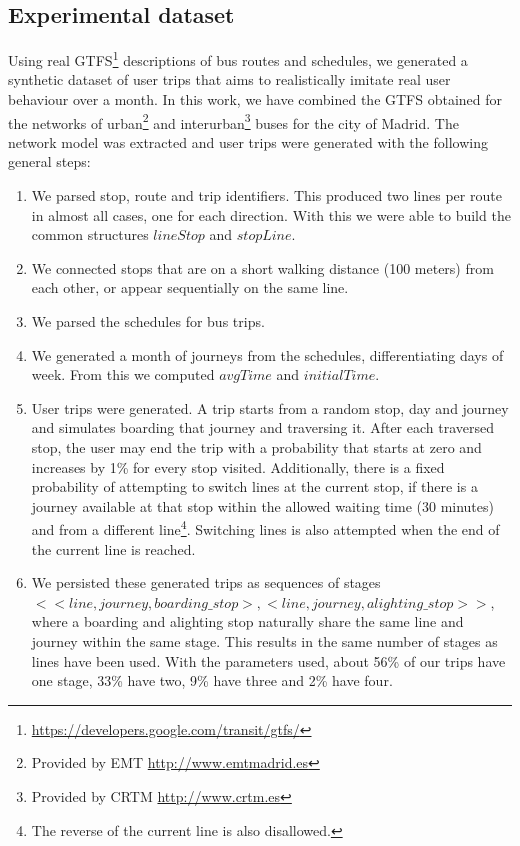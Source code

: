     \subsection{Experimental dataset}
    \label{sec:newctr:exp:data}
    Using real GTFS\footnote{\url{https://developers.google.com/transit/gtfs/}} descriptions of bus routes and schedules, we generated a synthetic dataset of user trips that aims to realistically imitate real user behaviour over a month. In this work, we have combined the GTFS obtained for the networks of urban\footnote{Provided by EMT \url{http://www.emtmadrid.es}} and interurban\footnote{Provided by CRTM \url{http://www.crtm.es}} buses for the city of Madrid. The network model was extracted and user trips were generated with the following general steps:
    
    \begin{enumerate}
        \item We parsed stop, route and trip identifiers. This produced two lines per route in almost all cases, one for each direction. With this we were able to build the common structures $lineStop$ and $stopLine$.
        \item We connected stops that are on a short walking distance (100 meters) from each other, or appear sequentially on the same line.
        \item We parsed the schedules for bus trips.
        \item We generated a month of journeys from the schedules, differentiating days of week. From this we computed $avgTime$ and $initialTime$.
        \item User trips were generated. A trip starts from a random stop, day and journey and simulates boarding that journey and traversing it. After each traversed stop, the user may end the trip with a probability that starts at zero and increases by 1\% for every stop visited. Additionally, there is a fixed probability of attempting to switch lines at the current stop, if there is a journey available at that stop within the allowed waiting time (30 minutes) and from a different line\footnote{The reverse of the current line is also disallowed.}. Switching lines is also attempted when the end of the current line is reached.
        \item We persisted these generated trips as sequences of stages \\ $<<line,journey,boarding\_stop>, <line,journey,alighting\_stop>>$,\\ where a boarding and alighting stop naturally share the same line and journey within the same stage. This results in the same number of stages as lines have been used. With the parameters used, about 56\% of our trips have one stage, 33\% have two, 9\% have three and 2\% have four.
    \end{enumerate}
    
